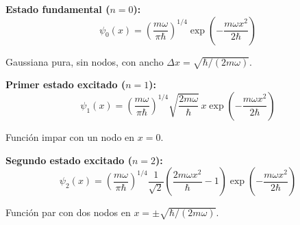 \textbf{Estado fundamental ($n=0$):}
\vspace{-5pt}
\begin{equation}
	\psi_0(x) = \left(\frac{m\omega}{\pi\hbar}\right)^{1/4} \exp\left(-\frac{m\omega x^2}{2\hbar}\right)
\end{equation}

Gaussiana pura, sin nodos, con ancho $\Delta x = \sqrt{\hbar/(2m\omega)}$.

\textbf{Primer estado excitado ($n=1$):}
\begin{equation}
	\psi_1(x) = \left(\frac{m\omega}{\pi\hbar}\right)^{1/4} \sqrt{\frac{2m\omega}{\hbar}} \, x \exp\left(-\frac{m\omega x^2}{2\hbar}\right)
\end{equation}

Función impar con un nodo en $x=0$.

\textbf{Segundo estado excitado ($n=2$):}
\begin{equation}
	\psi_2(x) = \left(\frac{m\omega}{\pi\hbar}\right)^{1/4} \frac{1}{\sqrt{2}}\left(\frac{2m\omega x^2}{\hbar} - 1\right) \exp\left(-\frac{m\omega x^2}{2\hbar}\right)
\end{equation}

Función par con dos nodos en $x = \pm\sqrt{\hbar/(2m\omega)}$.

\begin{table}[h]
    \centering
    \label{tab:estados}
    \caption[Propiedades de los primeros estados del oscilador armónico cuántico.]{Propiedades de los primeros estados del oscilador armónico cuántico. Fuente: elaboración propia}
\end{table}

